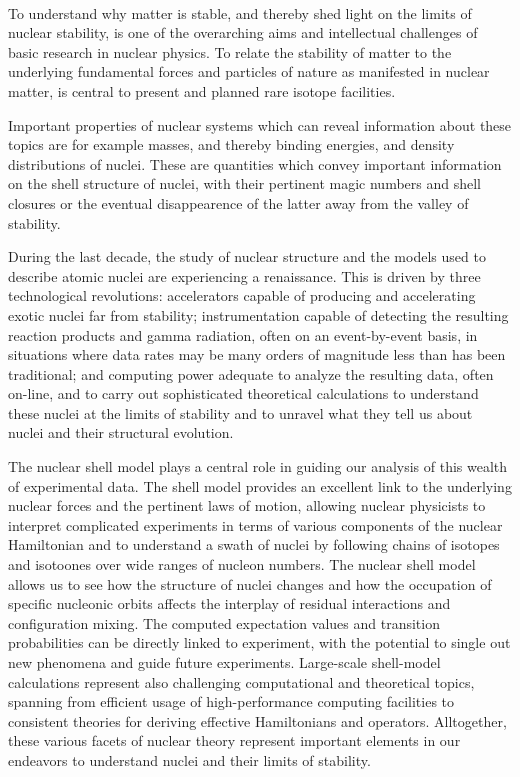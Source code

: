 \documentclass[%
oneside,                 %
final,                   %
10pt]{article}
\begin{document}
\paragraph{}
To understand why matter is stable, and thereby shed light on the
limits of nuclear stability, is one of the overarching aims and
intellectual challenges of basic research in nuclear physics. To
relate the stability of matter to the underlying fundamental forces
and particles of nature as manifested in nuclear matter, is central to
present and planned rare isotope facilities.  

Important properties of nuclear systems which can reveal information about these topics are
for example masses, and thereby binding energies, and density
distributions of nuclei.  These are quantities which convey important
information on the shell structure of nuclei, with their pertinent
magic numbers and shell closures or the eventual disappearence of the
latter away from the valley of stability.  

During the last decade,  the study of nuclear
structure and the models used to describe atomic nuclei are
experiencing a renaissance. This is driven by three technological
revolutions: accelerators capable of producing and accelerating exotic
nuclei far from stability; instrumentation capable of detecting the
resulting reaction products and gamma radiation, often on an
event-by-event basis, in situations where data rates may be many
orders of magnitude less than has been traditional; and computing
power adequate to analyze the resulting data, often on-line, and to
carry out sophisticated theoretical calculations to understand these
nuclei at the limits of stability and to unravel what they tell us
about nuclei and their structural evolution. 

The nuclear shell model plays a central role in guiding our analysis
of this wealth of experimental data.  
The shell model provides an
excellent link to the underlying nuclear forces and the pertinent laws
of motion, allowing nuclear physicists to interpret complicated
experiments in terms of various components of the nuclear Hamiltonian
and to understand a swath of nuclei by following chains of isotopes
and isotoones over wide ranges of nucleon numbers. The nuclear shell
model allows us to see how the structure of nuclei changes and how the
occupation of specific nucleonic orbits affects the interplay of
residual interactions and configuration mixing.  The computed
expectation values and transition probabilities can be directly linked
to experiment, with the potential to single out new phenomena and
guide future experiments.  Large-scale shell-model calculations
represent also challenging computational and theoretical topics,
spanning from efficient usage of high-performance computing facilities
to consistent theories for deriving effective Hamiltonians and
operators.  Alltogether, these various facets of nuclear theory
represent important elements in our endeavors to understand nuclei and
their limits of stability.  
\end{document}
